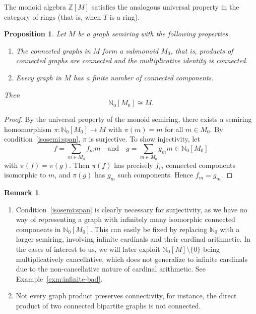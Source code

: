 \documentclass{amsart}
\theoremstyle{plain}
\newtheorem{proposition}[thm]{Proposition}
\theoremstyle{definition}
\newtheorem{remark}[thm]{Remark}
\newcommand{\bN}{\mathbb N}
\newcommand{\bZ}{\mathbb Z}
\begin{document}
The monoid algebra $\bZ[M]$ satisfies the analogous universal property in the category of rings (that is, when $T$ is a ring).

\begin{proposition} \label{p:iso-monoidsemiring}
  Let $M$ be a graph semiring with the following properties.
  \begin{enumerate}
  \item \label{isosemi:submonoid} The connected graphs in $M$ form a submonoid $M_0$, that is, products of connected graphs are connected and the multiplicative identity is connected.
  \item \label{isosemi:span} Every graph in $M$ has a finite number of connected components.
  \end{enumerate}
  Then
  \[
    \bN_0[M_0] \cong M.
  \]
\end{proposition}

\begin{proof}
  By the universal property of the monoid semiring, there exists a semiring homomorphism $\pi \colon \bN_0[M_0] \to M$ with $\pi(m)=m$ for all $m \in M_0$.
  By condition~\ref{isosemi:span}, $\pi$ is surjective.
  To show injectivity, let
  \[
  f = \sum_{m \in M_0} f_m m \quad\text{and}\quad g = \sum_{m \in M_0} g_m m \in \bN_0[M_0]
  \]
  with $\pi(f)=\pi(g)$.
  Then $\pi(f)$ has precisely $f_m$ connected components isomorphic to $m$, and $\pi(g)$ has $g_m$ such components. Hence $f_m=g_m$.
\end{proof}

\begin{remark}
  \begin{enumerate}
    \item Condition~\ref{isosemi:span} is clearly necessary for surjectivity, as we have no way of representing a graph with infinitely many isomorphic connected components in $\bN_0[M_0]$.
    This can easily be fixed by replacing $\bN_0$ with a larger semiring, involving infinite cardinals and their cardinal arithmetic.
    In the cases of interest to us, we will later exploit $\bN_0[M]\setminus\{0\}$ being multiplicatively cancellative, which does not generalize to infinite cardinals due to the non-cancellative nature of cardinal arithmetic.
    See Example~\ref{exm:infinite-bad}.

    \item Not every graph product preserves connectivity, for instance, the direct product of two connected bipartite graphs is not connected.
  \end{enumerate}
\end{remark}
\end{document}
